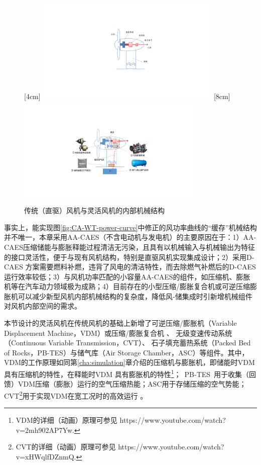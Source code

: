\begin{figure}[h]
  \centering%
  [4cm]
    {\includegraphics[height=5cm]{figures/Chap5-3-WT-mech-struc.pdf}}%
  \hspace{4em}%
  [8cm]
      {\includegraphics[height=5cm]{figures/Chap5-4-CA-WT-mech-struc.pdf}}
  \caption{传统（直驱）风机与灵活风机的内部机械结构}
  \label{fig:chap5-mech-struct}
\end{figure}

事实上，能实现图\ref{fig:CA-WT-power-curve}中修正的风功率曲线的“缓存”机械结构并不唯一，本章采用AA-CAES（不含电动机与发电机）的主要原因在于：1）AA-CAES压缩储能与膨胀释能过程清洁无污染，且具有以机械输入与机械输出为特征的接口灵活性，便于与现有风机结构，特别是直驱风机实现集成设计；2）采用D-CAES 方案需要燃料补燃，违背了风电的清洁特性，而去除燃气补燃后的D-CAES运行效率较低；3）与风机功率匹配的小容量AA-CAES的组件，如压缩机、膨胀机等在汽车动力领域极为成熟；4）目前存在的小型压缩/膨胀复合机或可逆压缩膨胀机可以减少新型风机内部机械结构的复杂度，降低风-储集成时引新增机械组件对风机内部空间的需求。


本节设计的灵活风机在传统风机的基础上新增了可逆压缩/膨胀机（Variable Displacement Machine，VDM）\cite{Thesis-Chengjie}或压缩/膨胀复合机
\cite{Thesis-Yangxinghua}、 无级变速传动系统（Continuous Variable Transmission，CVT）、 石子填充蓄热系统（Packed Bed of Rocks，PB-TES）与储气库（Air Storage Chamber，ASC）等组件。其中，VDM的工作原理如同第\ref{cha:simulation}章介绍的压缩机与膨胀机，即储能时VDM具有压缩机的特性，在释能时VDM 具有膨胀机的特性\footnote{VDM的详细（动画）原理可参见 https://www.youtube.com/watch?v=2mh902AP7Yw.}；~PB-TES~用于收集（回馈）VDM压缩（膨胀）运行的空气压缩热能；ASC用于存储压缩的空气势能；CVT\footnote{CVT的详细（动画）原理可参见 https://www.youtube.com/watch?v=xHWqlfDZnmQ.}用于实现VDM在宽工况时的高效运行
\cite{CA-RECS-Model-Rui-18}。

